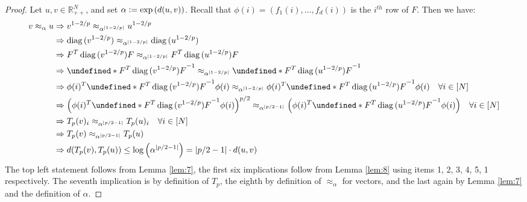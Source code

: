 \documentclass{article}
\theoremstyle{plain}
\theoremstyle{definition}
\theoremstyle{remark}
\newcommand{\defeq}{\vcentcolon=}
\let\brace\undefined
\DeclarePairedDelimiter{\brace}{\lbrace}{\rbrace}
\DeclarePairedDelimiter{\paren}{\lparen}{\rparen}
\newcommand{\R}{\mathbb{R}}
\newcommand{\logp}[1]{\log{\left(#1\right)}}
\DeclarePairedDelimiter{\abs}{\lvert}{\rvert}
\DeclareMathOperator{\diag}{diag}
\begin{document}
\begin{proof}
    Let $u, v \in \R_{++}^{N}$, and set $\alpha \defeq \exp{(d(u,v))}$. Recall that $\phi(i) = (f_1(i), \dotsc, f_d(i))$ is the $i^{th}$ row of $F$. Then we have:
    \begin{align*}
        v \approx_{\alpha} u &\Rightarrow v^{1-2/p} \approx_{\alpha^{\abs{1-2/p}}} u^{1 - 2/p} \\
        &\Rightarrow \diag{(v^{1-2/p})} \approx_{\alpha^{\abs{1-2/p}}} \diag{(u^{1-2/p})} \\
        &\Rightarrow F^{T}\diag{(v^{1-2/p})} F \approx_{\alpha^{\abs{1-2/p}}} F^{T} \diag{(u^{1-2/p})} F \\
        &\Rightarrow \brace*{F^{T}\diag{(v^{1-2/p})} F}^{-1} \approx_{\alpha^{\abs{1-2/p}}} \brace*{F^{T} \diag{(u^{1-2/p})} F}^{-1} \\
        &\Rightarrow \phi(i)^{T} \brace*{F^{T}\diag{(v^{1-2/p})} F}^{-1}\phi(i) \approx_{\alpha^{\abs{1-2/p}}} \phi(i)^{T} \brace*{F^{T} \diag{(u^{1-2/p})} F}^{-1} \phi(i) \quad \forall i \in [N] \\
        &\Rightarrow \paren*{\phi(i)^{T} \brace*{F^{T}\diag{(v^{1-2/p})} F}^{-1}\phi(i)}^{p/2} \approx_{\alpha^{\abs{p/2-1}}} \paren*{\phi(i)^{T} \brace*{F^{T} \diag{(u^{1-2/p})} F}^{-1} \phi(i)} \quad \forall i \in [N] \\
        &\Rightarrow T_p(v)_i \approx_{\alpha^{\abs{p/2-1}}} T_p(u)_i \quad \forall i \in [N] \\
        &\Rightarrow T_p(v) \approx_{\alpha^{\abs{p/2-1}}} T_p(u) \\
        &\Rightarrow d(T_p(v), T_p(u)) \leq \logp{\alpha^{{\abs{p/2-1}}}} = \abs{p/2-1} \cdot d(u, v)
    \end{align*}
    The top left statement follows from Lemma \ref{lem:7}, the first six implications follow from Lemma \ref{lem:8} using items 1, 2, 3, 4, 5, 1 respectively. The seventh implication is by definition of $T_p$, the eighth by definition of $\approx_{\alpha}$ for vectors, and the last again by Lemma \ref{lem:7} and the definition of $\alpha$.
\end{proof}
\end{document}
